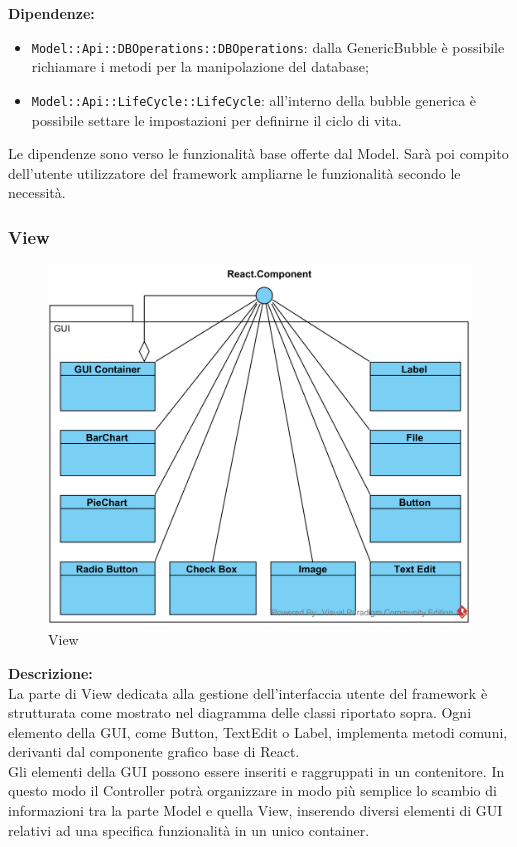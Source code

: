 \textbf{Dipendenze:}
\begin{itemize}
	\item \texttt{Model::Api::DBOperations::DBOperations}: dalla GenericBubble è possibile richiamare i metodi per la manipolazione del database;
	\item \texttt{Model::Api::LifeCycle::LifeCycle}: all'interno della bubble generica è possibile settare le impostazioni per definirne il ciclo di vita.
\end{itemize}
Le dipendenze sono verso le funzionalità base offerte dal Model. Sarà poi compito dell'utente utilizzatore del framework ampliarne le funzionalità secondo le necessità.


\subsubsection{View}
\begin{figure}[H]
	\centering
	\includegraphics[width=14cm]{diagrammi_img/classi_e_package/gui_classes.png}
	\caption{View}
\end{figure}
\textbf{Descrizione:}\\
La parte di View dedicata alla gestione dell'interfaccia utente del framework è strutturata come mostrato nel diagramma delle classi riportato sopra.
Ogni elemento della GUI, come Button, TextEdit o Label, implementa metodi comuni, derivanti dal componente grafico base di React.\\
Gli elementi della GUI possono essere inseriti e raggruppati in un contenitore. In questo modo il Controller potrà organizzare in modo più semplice lo scambio di informazioni tra la parte Model e quella View, inserendo diversi elementi di GUI relativi ad una specifica funzionalità in un unico container.

